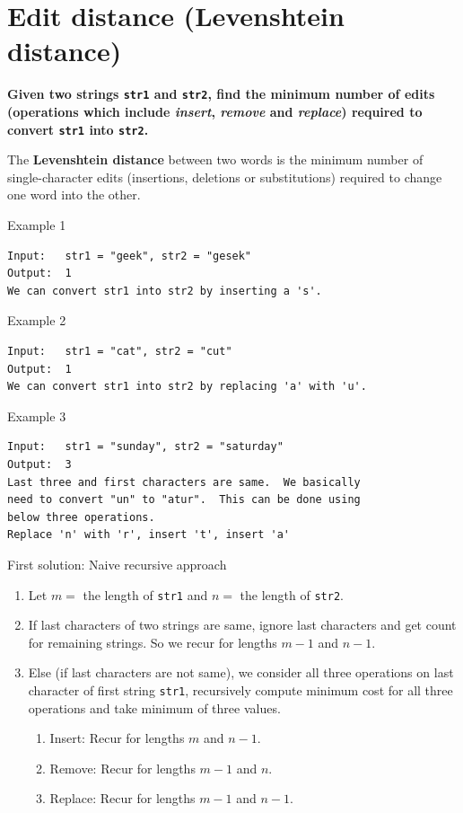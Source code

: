 \documentclass[a4paper,11pt]{book}
\begin{document}
\newpage
\section{Edit distance (Levenshtein distance)}

\textbf{Given two strings \lstinline{str1} and \lstinline{str2}, find the minimum number of edits (operations which include \textit{insert}, \textit{remove} and \textit{replace}) required to convert \lstinline{str1} into \lstinline{str2}.  }

\vspace{5mm}
\noindent The \textbf{Levenshtein distance} between two words is the minimum number of single-character edits (insertions, deletions or substitutions) required to change one word into the other. 
\vspace{5mm}

\noindent Example 1
\begin{lstlisting}
Input:   str1 = "geek", str2 = "gesek"
Output:  1
We can convert str1 into str2 by inserting a 's'.
\end{lstlisting}
\noindent Example 2
\begin{lstlisting}
Input:   str1 = "cat", str2 = "cut"
Output:  1
We can convert str1 into str2 by replacing 'a' with 'u'.
\end{lstlisting}
\noindent Example 3
\begin{lstlisting}
Input:   str1 = "sunday", str2 = "saturday"
Output:  3
Last three and first characters are same.  We basically
need to convert "un" to "atur".  This can be done using
below three operations. 
Replace 'n' with 'r', insert 't', insert 'a'
\end{lstlisting}

\noindent First solution: Naive recursive approach

\begin{enumerate}
\item Let $m = $ the length of \lstinline{str1} and $n=$ the length of \lstinline{str2}.
\item If last characters of two strings are same, ignore last characters and get count for remaining strings. So we recur for lengths $m-1$ and $n-1$.
\item Else (if last characters are not same), we consider all three operations on last character of first string \lstinline{str1}, recursively compute minimum cost for all three operations and take minimum of three values.
\begin{enumerate}
	\item Insert: Recur for lengths $m$ and $n-1$.
	\item Remove: Recur for lengths $m-1$ and $n$.
	\item Replace: Recur for lengths $m-1$ and $n-1$.
\end{enumerate}
\end{enumerate}
\end{document}
